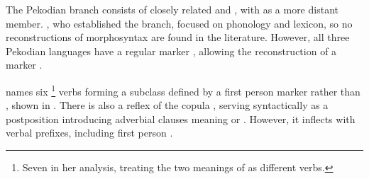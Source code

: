 \subsubsection{\PPek {}}
\label{sec:pekodian}
The Pekodian branch consists of closely related \arara and \ikpeng, with \bakairi as a more distant member.
\textcite{meira2005southern}, who established the branch, focused on phonology and lexicon, so no reconstructions of \PPek morphosyntax are found in the literature.
However, all three Pekodian languages have a regular  marker  , allowing the reconstruction of a \PPek {} marker .


%

\textcite{alves2017arara} names six%
\footnote{Seven in her analysis, treating the two meanings of   as different verbs.}
\arara {} verbs forming a subclass defined by a first person marker  rather than , shown in .
There is also a reflex of the copula  , serving syntactically as a postposition introducing adverbial clauses meaning  or  \parencite[199--201]{alves2017arara}.
However, it inflects with verbal \setone prefixes, including first person  .

